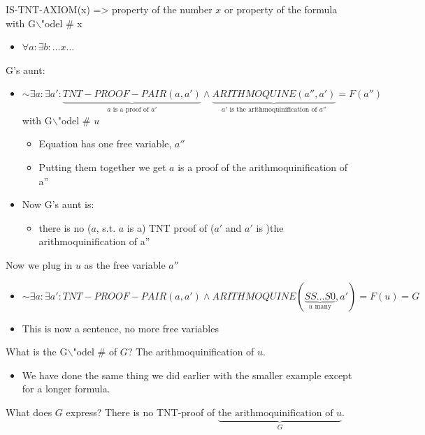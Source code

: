 \documentclass[11pt]{article}
\begin{document}
IS-TNT-AXIOM(x) => property of the number \(x\) or property of the formula with G$\backslash$"odel \# x
\begin{itemize}
\item \(\forall a : \exists b: \ldots x \ldots\)
\end{itemize}

G's aunt:
\begin{itemize}
\item \(\sim \exists a : \exists a': \underbrace{TNT-PROOF-PAIR(a,a')}_{a \text{ is a proof of }a'} \wedge \underbrace{ARITHMOQUINE(a'', a')}_{a' \text{ is the arithmoquinification of }a''} = F(a'')\) with G$\backslash$"odel \# \(u\)
\begin{itemize}
\item Equation has one free variable, \(a''\)
\item Putting them together we get \(a\) is a proof of the arithmoquinification of a''
\end{itemize}
\item Now G's aunt is:
\begin{itemize}
\item there is no (\(a\), s.t. \(a\) is a) TNT proof of (\(a'\) and \(a'\) is )the arithmoquinification of a''
\end{itemize}
\end{itemize}
Now we plug in \(u\) as the free variable \(a''\)
\begin{itemize}
\item \(\sim \exists a : \exists a': TNT-PROOF-PAIR(a,a') \wedge ARITHMOQUINE (\underbrace{SS\ldots S 0}_{u \text{ many}},a') = F(u) = G\)
\item This is now a sentence, no more free variables
\end{itemize}
What is the G$\backslash$"odel \# of \(G\)? The arithmoquinification of \(u\).
\begin{itemize}
\item We have done the same thing we did earlier with the smaller example except for a longer formula.
\end{itemize}
What does \(G\) express? There is no TNT-proof of \(\underbrace{\text{the arithmoquinification of }u}_{G}\).
\end{document}
